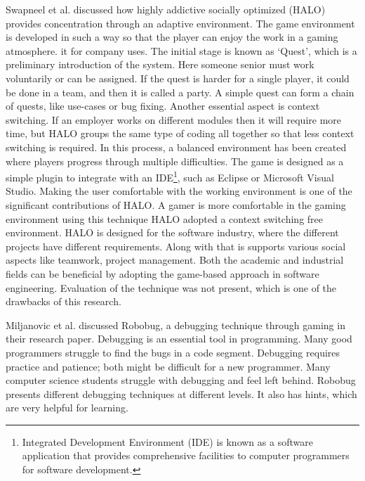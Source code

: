 Swapneel et al. \cite{halo} discussed how highly addictive socially optimized (HALO) provides concentration through an adaptive environment. The game environment is developed in such a way so that the player can enjoy the work in a gaming atmosphere. 
it for company uses. The initial stage is known as ‘Quest’, which is a preliminary introduction of the system. Here someone senior must work voluntarily or can be assigned. If the quest is harder for a single player, it could be done in a team, and then it is called a party. A simple quest can form a chain of quests, like use-cases or bug fixing. Another essential aspect is context switching. If an employer works on different modules then it will require more time, but HALO groups the same type of coding all together so that less context switching is required. In this process, a balanced environment has been created where players progress through multiple difficulties. The game is designed as a simple plugin to integrate with an IDE\footnote{Integrated Development Environment (IDE) is known as a software application that provides comprehensive facilities to computer programmers for software development.}, such as Eclipse or Microsoft Visual Studio. Making the user comfortable with the working environment is one of the significant contributions of HALO. A gamer is more comfortable in the gaming environment using this technique HALO adopted a context switching free environment. HALO is designed for the software industry, where the different projects have different requirements. Along with that is supports various social aspects like teamwork, project management.
Both the academic and industrial fields can be beneficial by adopting the game-based approach in software engineering.  Evaluation of the technique was not present, which is one of the drawbacks of this research.  

Miljanovic et al. \cite{robobug} discussed Robobug, a debugging technique through gaming in their research paper. Debugging is an essential tool in programming. Many good programmers struggle to find the bugs in a code segment. Debugging requires practice and patience; both might be difficult for a new programmer. Many computer science students struggle with debugging and feel left behind. Robobug presents different debugging techniques at different levels. It also has hints, which are very helpful for learning.

